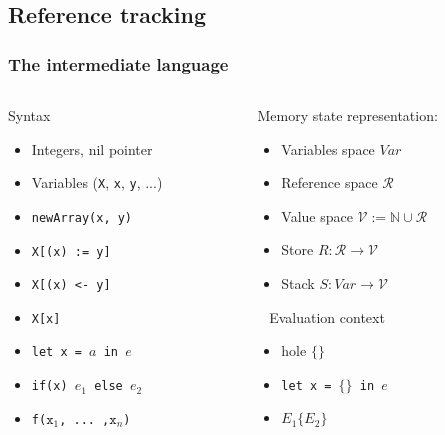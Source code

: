 \documentclass{beamer}
\newcommand{\cl}[1]{\texttt{#1}}
\newcommand{\N}{\mathbb{N}}
\begin{document}
\subsection{Reference tracking}

\begin{frame}
\frametitle{The intermediate language}
\begin{columns}
\begin{column}{0.45\textwidth}
Syntax
\begin{itemize}
\item Integers, nil pointer
\item Variables (\cl{X}, \cl{x}, \cl{y}, ...)
\item \cl{newArray(x, y)}
\item \cl{X[(x) := y]}
\item \cl{X[(x) <- y]}
\item \cl{X[x]}
\item \cl{let x = $a$ in $e$}
\item \cl{if(x) $e_1$ else $e_2$}
\item \cl{f($\cl{x}_1$, ... ,$\cl{x}_n$)}
\end{itemize}
\end{column}

\begin{column}{0.55\textwidth}
Memory state representation:
\begin{itemize}
\item Variables space $Var$
\item Reference space $\mathcal{R}$
\item Value space $\mathcal{V} := \N \cup \mathcal{R}$
\item Store $R : \mathcal{R} \longrightarrow \mathcal{V}$
\item Stack $S : Var \longrightarrow \mathcal{V}$
\end{itemize}
\ \newline
Evaluation context
\begin{itemize}
\item hole $\{\}$
\item \cl{let x = $\{\}$ in $e$}
\item $E_1\{E_2\}$
\end{itemize}
\end{column}
\end{columns}

\end{frame}
\end{document}

